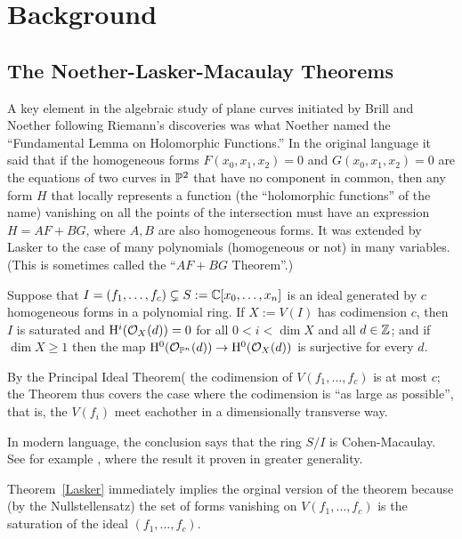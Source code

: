 

\chapter{Background}

\section{The Noether-Lasker-Macaulay Theorems}

A key element in the algebraic study of plane curves initiated by Brill and Noether following Riemann's discoveries was what Noether named the ``Fundamental Lemma on Holomorphic Functions.'' In the original language it said that if the homogeneous forms $F(x_{0},x_{1},x_{2})=0$ and $G(x_{0},x_{1},x_{2})=0$ are the equations of two curves in $\PP^{2}$ that have no component in common, then any form $H$ that locally represents a function (the ``holomorphic functions'' of the name) vanishing on all the points
of the intersection must have an expression $H = AF+BG$, where $A,B$ are also homogeneous forms. It was extended by Lasker to the case of many polynomials (homogeneous or not) in many variables. (This is sometimes called the ``$AF+BG$ Theorem''.) 

\begin{theorem}\label{Lasker}
Suppose that $I = (f_{1}, \dots, f_{c}) \subsetneq S:=\CC[x_{0},\dots,x_{n}]$ is an ideal generated by $c$ homogeneous forms in a polynomial ring. 
If $X:= V(I)$ has codimension $c$, then $I$ is saturated and $\HH^{i}(\cO_{X}(d)) = 0$ for all $0<i<\dim X$ and all $d\in \ZZ$; and if $\dim X\geq 1$
then the map
$\HH^{0}(\cO_{\PP^{n}}(d)) \to \HH^{0}(\cO_{X}(d))$ is surjective for every $d$.
\end{theorem}

By the Principal Ideal Theorem(\cite[Theorem ***]{Eisenbud95} the codimension of $V(f_{1},\dots, f_{c})$ is at most $c$;
the Theorem thus covers the case where the codimension is ``as large as possible'', that is, the $V(f_{i})$ meet eachother
in a dimensionally transverse way.

In modern language, the conclusion says that the ring $S/I$ is Cohen-Macaulay. See for example \cite[Chapter 18]{Eisenbud95}, where the result it proven in greater generality.

Theorem~\ref{Lasker} immediately implies the orginal version of the theorem because (by the Nullstellensatz) the set of forms vanishing on $V(f_{1}, \dots, f_{c})$ is the saturation 
of the ideal $(f_{1}, \dots, f_{c})$. 

